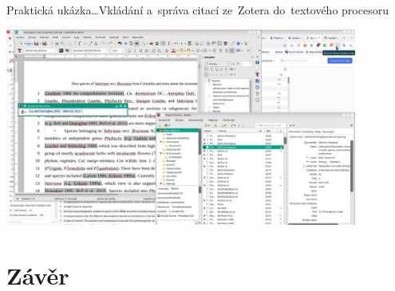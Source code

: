\documentclass[compress, xelatex, 11pt, xcolor=svgnames, aspectratio=169,
	hyperref={
		bookmarks=true,
		unicode=true,
		colorlinks=true,
		pdftitle={Citacni software},
		plainpages=false,
		pdfauthor={Vojtech Zeisek},
		pdfsubject={Kratky uvod do citacniho software},
		pdfcreator={XeLaTeX},
		pdfkeywords={citace, reference, software, literatura},
		linkcolor=Crimson, %
		anchorcolor=Magenta, %
		citecolor=Magenta, %
		filecolor=Magenta, %
		menucolor=Magenta, %
		urlcolor=DarkTurquoise, %
		},
	url={hyphens, lowtilde} %
	]{beamer}
\begin{document}
\begin{frame}{Praktická ukázka\ldots}{Vkládání a~správa citací ze~Zotera do~textového procesoru}
	\begin{center}
		\includegraphics[height=6.5cm]{zotero_writer_knihovna.png}
	\end{center}
\end{frame}

\section{Závěr}
\end{document}
